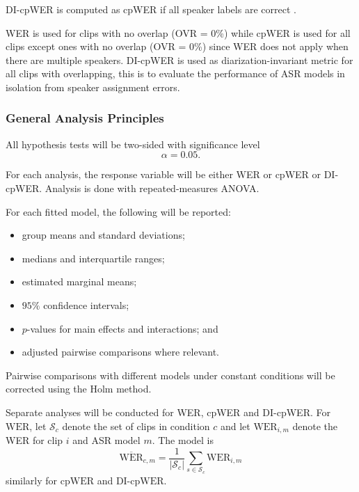 DI-cpWER is computed as cpWER if all speaker labels are correct \cite{Word_Error_Rate_Definitions}.

WER is used for clips with no overlap (OVR = 0\%) while cpWER is used for all clips except ones with no overlap (OVR = 0\%) since WER does not apply when there are multiple speakers. DI-cpWER is used as diarization-invariant metric for all clips with overlapping, this is to evaluate the performance of ASR models in isolation from speaker assignment errors.

\subsubsection{General Analysis Principles}

All hypothesis tests will be two-sided with significance level
\begin{equation}
\alpha = 0.05.
\end{equation}

For each analysis, the response variable will be either WER or cpWER or DI-cpWER. Analysis is done with repeated-measures ANOVA.

For each fitted model, the following will be reported:
\begin{itemize}
    \item group means and standard deviations;
    \item medians and interquartile ranges;
    \item estimated marginal means;
    \item \(95\%\) confidence intervals;
    \item \(p\)-values for main effects and interactions; and
    \item adjusted pairwise comparisons where relevant.
\end{itemize}

Pairwise comparisons with different models under constant conditions will be corrected using the Holm method.



Separate analyses will be conducted for WER, cpWER and DI-cpWER. 
For $\text{WER}$, let $\mathcal S_c$ denote the set of clips in condition $c$ and let $\text{WER}_{i,m}$ denote the WER for clip \(i\) and ASR model \(m\). The model is
\begin{equation}
\overline{\text{WER}}_{c,m}=\frac1{|\mathcal S_c|}\sum_{s\in\mathcal S_c}\text{WER}_{i,m}
\end{equation}
similarly for $\text{cpWER}$ and $\text{DI-cpWER}$.



